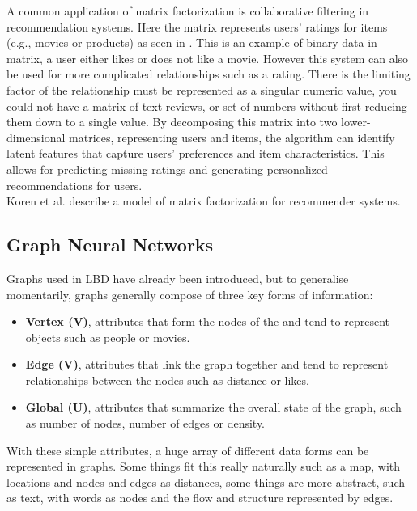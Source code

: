 \documentclass{l4proj}
\begin{document}
A common application of matrix factorization is collaborative filtering in recommendation systems. Here the matrix represents users' ratings for items (e.g., movies or products) as seen in . This is an example of binary data in matrix, a user either likes or does not like a movie. However this system can also be used for more complicated relationships such as a rating. There is the limiting factor of the relationship must be represented as a singular numeric value, you could not have a matrix of text reviews, or set of numbers without first reducing them down to a single value. By decomposing this matrix into two lower-dimensional matrices, representing users and items, the algorithm can identify latent features that capture users' preferences and item characteristics. This allows for predicting missing ratings and generating personalized recommendations for users. \\

Koren et al. describe a model of matrix factorization for recommender systems.

\subsection{Graph Neural Networks}

Graphs used in LBD have already been introduced, but to generalise momentarily, graphs generally compose of three key forms of information:
\\
\begin{itemize}
    \item \textbf{Vertex (V)}, attributes that form the nodes of the and tend to represent objects such as people or movies.
    \item \textbf{Edge (V)}, attributes that link the graph together and tend to represent relationships between the nodes such as distance or likes. 
    \item \textbf{Global (U)}, attributes that summarize the overall state of the graph, such as number of nodes, number of edges or density. \\
\end{itemize}

With these simple attributes, a huge array of different data forms can be represented in graphs. Some things fit this really naturally such as a map, with locations and nodes and edges as distances, some things are more abstract, such as text, with words as nodes and the flow and structure represented by edges. \\
\end{document}
